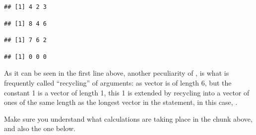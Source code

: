 \documentclass[krantz2]{krantz}\usepackage{knitr}%
\begin{document}
\begin{knitrout}\footnotesize
{}\color{fgcolor}\begin{kframe}
\begin{alltt}
 \hlopt{+}  
\end{alltt}
\begin{verbatim}
## [1] 4 2 3
\end{verbatim}
\begin{alltt}
 \hlopt{+} \hlstd{)} \hlopt{*} 
\end{alltt}
\begin{verbatim}
## [1] 8 4 6
\end{verbatim}
\begin{alltt}
 \hlopt{+} 
\end{alltt}
\begin{verbatim}
## [1] 7 6 2
\end{verbatim}
\begin{alltt}
 \hlopt{-} 
\end{alltt}
\begin{verbatim}
## [1] 0 0 0
\end{verbatim}
\end{kframe}
\end{knitrout}

As it can be seen in the first line above, another peculiarity of \Rpgrm, is what is frequently called ``recycling'' of arguments: as vector  is of length 6, but the constant 1 is a vector of length 1, this 1 is extended by recycling into a vector of ones of the same length as the longest vector in the statement, in this case, .\label{par:recycling:numeric}

Make sure you understand what calculations are taking place in the chunk above, and also the one below.
\end{document}
